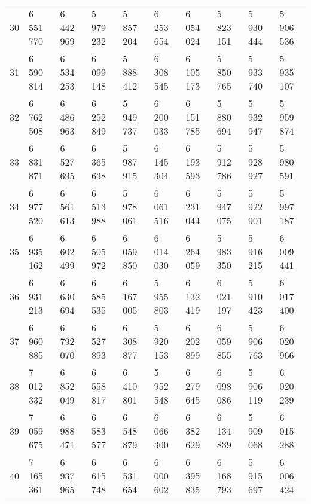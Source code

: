 \begin{table}[h!]
{\begin{tabular}{llllllllll}
30    & 6 551 770 & 6 442 969 & 5 979 232 & 5 857 204 & 6 253 654 & 6 054 024 & 5 823 151 & 5 930 444 & 5 906 536 \\
31    & 6 590 814 & 6 534 253 & 6 099 148 & 5 888 412 & 6 308 545 & 6 105 173 & 5 850 765 & 5 933 740 & 5 935 107 \\
32    & 6 762 508 & 6 486 963 & 6 252 849 & 5 949 737 & 6 200 033 & 6 151 785 & 5 880 694 & 5 932 947 & 5 959 874 \\
33    & 6 831 871 & 6 527 695 & 6 365 638 & 5 987 915 & 6 145 304 & 6 193 593 & 5 912 786 & 5 928 927 & 5 980 591 \\
34    & 6 977 520 & 6 561 613 & 6 513 988 & 5 978 061 & 6 061 516 & 6 231 044 & 5 947 075 & 5 922 901 & 5 997 187 \\
35    & 6 935 162 & 6 602 499 & 6 505 972 & 6 059 850 & 6 014 030 & 6 264 059 & 5 983 350 & 5 916 215 & 6 009 441 \\
36    & 6 931 213 & 6 630 694 & 6 585 535 & 6 167 005 & 5 955 803 & 6 132 419 & 6 021 197 & 5 910 423 & 6 017 400 \\
37    & 6 960 885 & 6 792 070 & 6 527 893 & 6 308 877 & 5 920 153 & 6 202 899 & 6 059 855 & 5 906 763 & 6 020 966 \\
38    & 7 012 332 & 6 852 049 & 6 558 817 & 6 410 801 & 5 952 548 & 6 279 645 & 6 098 086 & 5 906 119 & 6 020 239 \\
39    & 7 059 675 & 6 988 471 & 6 583 577 & 6 548 879 & 6 066 300 & 6 382 629 & 6 134 839 & 5 909 068 & 6 015 288 \\
40    & 7 165 361 & 6 937 965 & 6 615 748 & 6 531 654 & 6 000 602 & 6 395 835 & 6 168 793 & 5 915 697 & 6 006 424 \\ 
\end{tabular}}
\end{table}

\newpage

